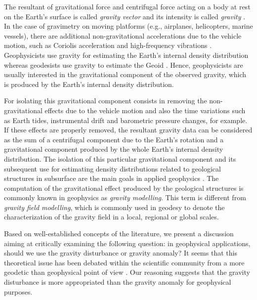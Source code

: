 \documentclass[extra]{gji}
\begin{document}
The resultant of gravitational force and centrifugal force acting 
on a body at rest on the Earth's surface is called 
\textit{gravity vector} and its intensity is called 
\textit{gravity} \citep{heiskanen-moritz1967,
hofmann-wellenhof-moritz2005}.
In the case of gravimetry on moving platforms (e.g., airplanes,
helicopters, marine vessels), there are additional
non-gravitational accelerations due to the vehicle motion, 
such as Coriolis acceleration and high-frequency vibrations 
\citep{glennie-etal2000,nabighian-etal2005-grav,baumann-etal2012}.
Geophysicists use gravity for estimating the Earth's 
internal density distribution whereas geodesists use
gravity to estimate the Geoid \citep{li2001}.
Hence, geophysicists are usually interested 
in the gravitational component of the observed gravity, 
which is produced by the Earth's internal 
density distribution.

For isolating this 
gravitational component consists in removing the non-gravitational 
effects due to the vehicle motion and also the time variations 
such as Earth tides, instrumental drift and barometric 
pressure changes, for example.
If these effects are properly removed, the resultant 
gravity data can be considered as the sum of a 
centrifugal component due to the Earth's rotation and
a gravitational component produced by the whole Earth's
internal density distribution.
The isolation of this particular gravitational component 
and its subsequent use for estimating density 
distributions related to geological structures in subsurface 
are the main goals in applied geophysics \citep{blakely1996}.
The computation of the gravitational effect produced by
the geological structures is commonly known in geophysics as 
\textit{gravity modelling}.
This term is different from \textit{gravity field modelling}, which
is commonly used in geodesy to denote the characterization of the 
gravity field in a local, regional or global scales.

Based on well-established concepts of the literature,
we present a discussion aiming at critically examining
the following question: in geophysical applications,
should we use the gravity disturbance or gravity anomaly?
It seems that this theoretical issue has been 
debated within the scientific community from a 
more geodetic than geophysical point of view
\citep{lafehr1991,chapin1996,li2001,fairhead2003,
hackney-featherstone2003,hinze2005}.
Our reasoning suggests that the gravity 
disturbance is more appropriated than the gravity anomaly 
for geophysical purposes.
\end{document}
